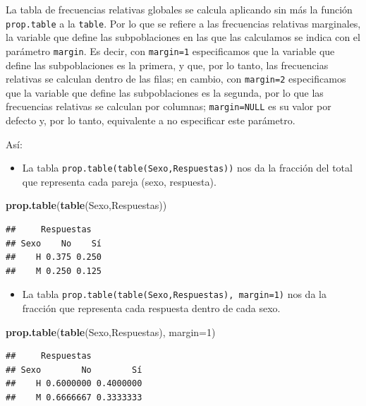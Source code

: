 \documentclass[]{book}
\newenvironment{Shaded}{\begin{snugshade}}{\end{snugshade}}
\newcommand{\DataTypeTok}[1]{\textcolor[rgb]{0.13,0.29,0.53}{#1}}
\newcommand{\DecValTok}[1]{\textcolor[rgb]{0.00,0.00,0.81}{#1}}
\newcommand{\KeywordTok}[1]{\textcolor[rgb]{0.13,0.29,0.53}{\textbf{#1}}}
\newcommand{\NormalTok}[1]{#1}
\providecommand{\tightlist}{%
  \setlength{\itemsep}{0pt}\setlength{\parskip}{0pt}}
\theoremstyle{definition}
\theoremstyle{definition}
\theoremstyle{definition}
\theoremstyle{remark}
\begin{document}
La tabla de frecuencias relativas globales se calcula aplicando sin más la función \texttt{prop.table} a la \texttt{table}.
Por lo que se refiere a las frecuencias relativas marginales, la variable que define las subpoblaciones en las que las calculamos se indica con el parámetro \texttt{margin}. Es decir, con \texttt{margin=1} especificamos que la variable que define las subpoblaciones es la primera, y que, por lo tanto, las frecuencias relativas se calculan dentro de las filas; en cambio, con \texttt{margin=2} especificamos que la variable que define las subpoblaciones es la segunda, por lo que las frecuencias relativas se calculan por columnas; \texttt{margin=NULL} es su valor por defecto y, por lo tanto, equivalente a no especificar este parámetro.

Así:

\begin{itemize}
\tightlist
\item
  La tabla \texttt{prop.table(table(Sexo,Respuestas))} nos da la fracción del total que representa cada pareja (sexo, respuesta).
\end{itemize}

\begin{Shaded}
\begin{Highlighting}[]
\KeywordTok{prop.table}\NormalTok{(}\KeywordTok{table}\NormalTok{(Sexo,Respuestas))}
\end{Highlighting}
\end{Shaded}

\begin{verbatim}
##     Respuestas
## Sexo    No    Sí
##    H 0.375 0.250
##    M 0.250 0.125
\end{verbatim}

\begin{itemize}
\tightlist
\item
  La tabla \texttt{prop.table(table(Sexo,Respuestas),\ margin=1)} nos da la fracción que representa cada respuesta dentro de cada sexo.
\end{itemize}

\begin{Shaded}
\begin{Highlighting}[]
\KeywordTok{prop.table}\NormalTok{(}\KeywordTok{table}\NormalTok{(Sexo,Respuestas), }\DataTypeTok{margin=}\DecValTok{1}\NormalTok{)}
\end{Highlighting}
\end{Shaded}

\begin{verbatim}
##     Respuestas
## Sexo        No        Sí
##    H 0.6000000 0.4000000
##    M 0.6666667 0.3333333
\end{verbatim}
\end{document}
